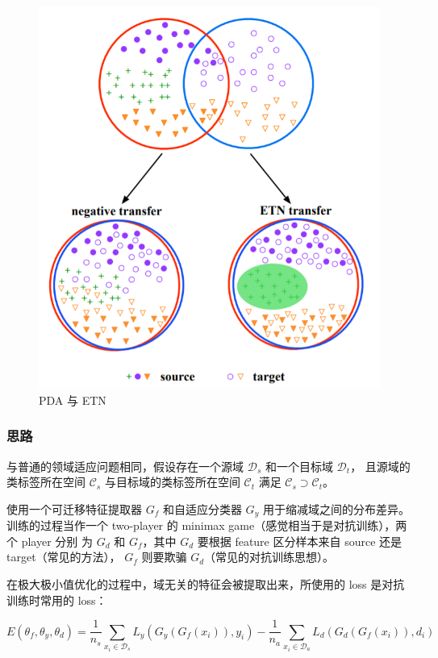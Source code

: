 \documentclass[UTF8]{ctexart}
\begin{document}
\begin{figure}[ht]
    \centering
    \includegraphics[scale=0.3]{Week10_Negative.png}
    \caption{PDA 与 ETN}
    \label{fig:Negative}
\end{figure}

\subsubsection{思路}
与普通的领域适应问题相同，假设存在一个源域 $\mathcal{D}_s$ 和一个目标域 $\mathcal{D}_t$，
且源域的类标签所在空间 $\mathcal{C}_s$ 与目标域的类标签所在空间 $\mathcal{C}_t$ 满足 $\mathcal{C}_s \supset \mathcal{C}_t$。

使用一个可迁移特征提取器 $G_f$ 和自适应分类器 $G_y$ 用于缩减域之间的分布差异。
训练的过程当作一个 two-player 的 minimax game（感觉相当于是对抗训练），两个 player 分别
为 $G_d$ 和 $G_f$，其中 $G_d$ 要根据 feature 区分样本来自 source 还是 target（常见的方法），
$G_f$ 则要欺骗 $G_d$（常见的对抗训练思想）。

在极大极小值优化的过程中，域无关的特征会被提取出来，所使用的 loss 是对抗训练时常用的 loss：

$$
E(\theta_f, \theta_y, \theta_d) = \frac{1}{n_s}\sum_{x_i\in\mathcal{D}_s}L_y(G_y(G_f(x_i)), y_i) - \frac{1}{n_a}\sum_{x_i\in\mathcal{D}_a}L_d(G_d(G_f(x_i)), d_i)
$$
\end{document}
